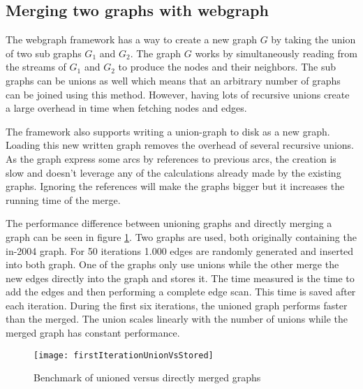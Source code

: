 \subsection{Merging two graphs with webgraph}

The webgraph framework has a way to create a new graph $G$ by taking the union of two sub graphs $G_1$ and $G_2$. The graph $G$ works by simultaneously reading from the streams of $G_1$ and $G_2$ to produce the nodes and their neighbors. The sub graphs can be unions as well which means that an arbitrary number of graphs can be joined using this method. However, having lots of recursive unions create a large overhead in time  when fetching nodes and edges. \cite{webgraph} 

The framework also supports writing a union-graph to disk as a new graph. Loading this new written graph removes the overhead of several recursive unions. As the graph express some arcs by references to previous arcs, the creation is slow and doesn't leverage any of the calculations already made by the existing graphs. Ignoring the references will make the graphs bigger but it increases the running time of the merge.

The performance difference between unioning graphs and directly merging a graph can be seen in figure \ref{fig:firstIterationUnionVsStored}. Two graphs are used, both originally containing the in-2004 graph. For 50 iterations 1.000 edges are randomly generated and inserted into both graph. One of the graphs only use unions while the other merge the new edges directly into the graph and stores it. The time measured is the time to add the edges and then performing a complete edge scan. This time is saved after each iteration. During the first six iterations, the unioned graph performs faster than the merged. The union scales linearly with the number of unions while the merged graph has constant performance.  

\begin{figure}[h]
\centering
\texttt{[image: firstIterationUnionVsStored]}    
\captionsetup{justification=centering}
\caption {Benchmark of unioned versus directly merged graphs}
\label{fig:firstIterationUnionVsStored}
\end{figure}

